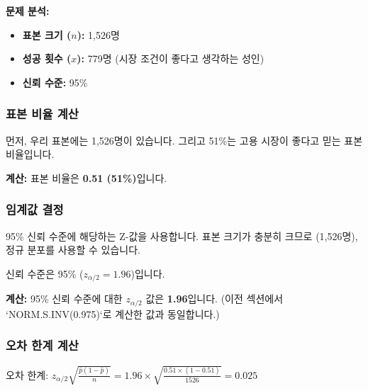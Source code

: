 \documentclass[11pt,a4paper]{article}
\begin{document}
\textbf{문제 분석:}
\begin{itemize}
    \item \textbf{표본 크기 ($n$):} 1,526명
    \item \textbf{성공 횟수 ($x$):} 779명 (시장 조건이 좋다고 생각하는 성인)
    \item \textbf{신뢰 수준:} 95\%
\end{itemize}

\subsubsection{표본 비율 계산}

\begin{tcolorbox}[title=슬라이드 71: 지역 고용 시장 조건이 좋은가? (2/2)]
먼저, 우리 표본에는 1,526명이 있습니다. 그리고 51\%는 고용 시장이 좋다고 믿는 표본 비율입니다.
\end{tcolorbox}

\textbf{계산:}
표본 비율은 \textbf{0.51 (51\%)}입니다.

\subsubsection{임계값 결정}

95\% 신뢰 수준에 해당하는 Z-값을 사용합니다. 표본 크기가 충분히 크므로 (1,526명), 정규 분포를 사용할 수 있습니다.

\begin{tcolorbox}[title=슬라이드 71: 지역 고용 시장 조건이 좋은가? (2/2)]
신뢰 수준은 95\% ($z_{\alpha/2} = 1.96$)입니다.
\end{tcolorbox}

\textbf{계산:}
95\% 신뢰 수준에 대한 $z_{\alpha/2}$ 값은 \textbf{1.96}입니다. (이전 섹션에서 `NORM.S.INV(0.975)`로 계산한 값과 동일합니다.)

\subsubsection{오차 한계 계산}

\begin{tcolorbox}[title=슬라이드 71: 지역 고용 시장 조건이 좋은가? (2/2)]
오차 한계: $z_{\alpha/2} \sqrt{\frac{\hat{p}(1-\hat{p})}{n}} = 1.96 \times \sqrt{\frac{0.51 \times (1-0.51)}{1526}} = 0.025$
\end{tcolorbox}
\end{document}
